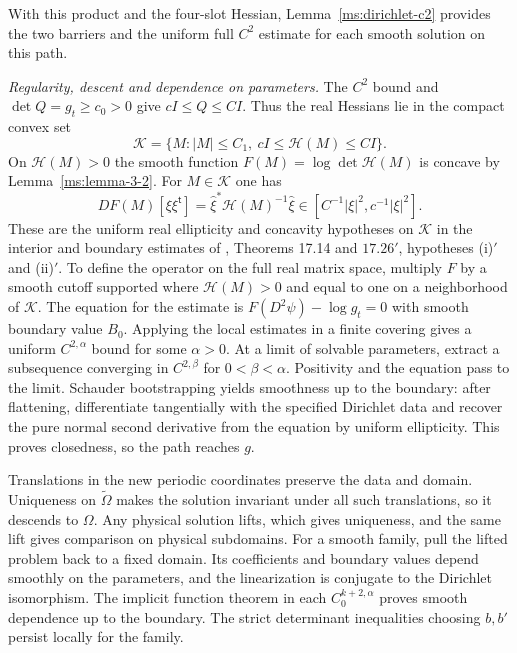 With this product and the four-slot Hessian, Lemma~\ref{ms:dirichlet-c2} provides the two barriers and the uniform full $C^2$ estimate for each smooth solution on this path.

\emph{Regularity, descent and dependence on parameters.} The $C^2$ bound and $\det Q=g_t\ge c_0>0$ give $cI\le Q\le CI$. Thus the real Hessians lie in the compact convex set
\[
 \mathcal K=\{M:|M|\le C_1,\ cI\le\mathcal H(M)\le CI\}.
\]
On $\mathcal H(M)>0$ the smooth function $F(M)=\log\det\mathcal H(M)$ is concave by Lemma~\ref{ms:lemma-3-2}. For $M\in\mathcal K$ one has
\[
 DF(M)[\xi\xi^{\mathsf t}]=
 \widehat\xi^*\mathcal H(M)^{-1}\widehat\xi
 \in[C^{-1}|\xi|^2,c^{-1}|\xi|^2].
\]
These are the uniform real ellipticity and concavity hypotheses on $\mathcal K$ in the interior and boundary estimates of \cite{r-31}, Theorems 17.14 and $17.26'$, hypotheses (i)$'$ and (ii)$'$. To define the operator on the full real matrix space, multiply $F$ by a smooth cutoff supported where $\mathcal H(M)>0$ and equal to one on a neighborhood of $\mathcal K$. The equation for the estimate is $F(D^2\psi)-\log g_t=0$ with smooth boundary value $B_0$. Applying the local estimates in a finite covering gives a uniform $C^{2,\alpha}$ bound for some $\alpha>0$. At a limit of solvable parameters, extract a subsequence converging in $C^{2,\beta}$ for $0<\beta<\alpha$. Positivity and the equation pass to the limit. Schauder bootstrapping yields smoothness up to the boundary: after flattening, differentiate tangentially with the specified Dirichlet data and recover the pure normal second derivative from the equation by uniform ellipticity. This proves closedness, so the path reaches $g$.

Translations in the new periodic coordinates preserve the data and domain. Uniqueness on $\widetilde\Omega$ makes the solution invariant under all such translations, so it descends to $\Omega$. Any physical solution lifts, which gives uniqueness, and the same lift gives comparison on physical subdomains. For a smooth family, pull the lifted problem back to a fixed domain. Its coefficients and boundary values depend smoothly on the parameters, and the linearization is conjugate to the Dirichlet isomorphism. The implicit function theorem in each $C_0^{k+2,\alpha}$ proves smooth dependence up to the boundary. The strict determinant inequalities choosing $b,b'$ persist locally for the family.
